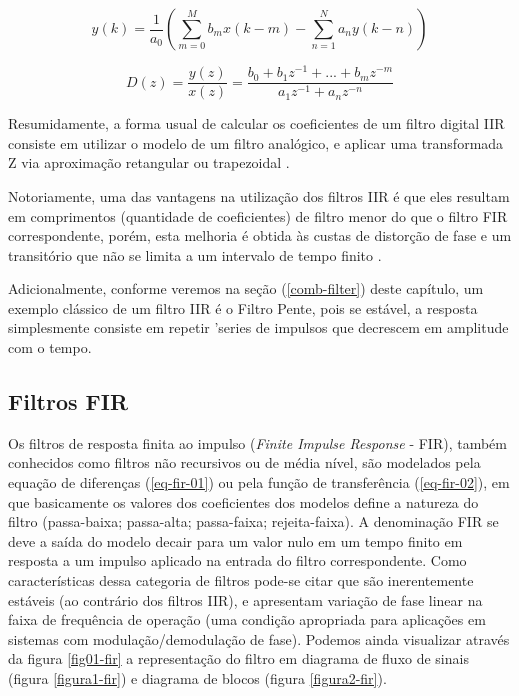 		\begin{equation}
			y(k) = \frac{1}{a_0}\left(\sum_{m=0}^{M}b_mx(k-m)-\sum_{n=1}^{N} a_ny(k-n)\right)
			\label{eq1-iir}
		\end{equation}
		
		\begin{equation}
			D(z) = \frac{y(z)}{x(z)} = \frac{b_0 + b_1z^{-1}+...+ b_mz^{-m}}{a_1z^{-1}+ a_nz^{-n}}
			\label{eq2-iir-tf}
		\end{equation}
		
		Resumidamente, a forma usual de calcular os coeficientes de um filtro digital IIR consiste em utilizar o modelo de um filtro analógico, e aplicar uma transformada Z via aproximação retangular ou trapezoidal \cite{Oppenhein1998}.
		
		Notoriamente, uma das vantagens na utilização dos filtros IIR é que eles resultam em comprimentos (quantidade de coeficientes) de filtro menor do que o filtro FIR correspondente, porém, esta melhoria é obtida às custas de distorção de fase e um transitório que não se limita a um intervalo de tempo finito \cite{Roberts1987}.
		
		Adicionalmente, conforme veremos na seção (\ref{comb-filter}) deste capítulo, um exemplo clássico de um filtro IIR é o Filtro Pente, pois se estável, a resposta simplesmente consiste em repetir 'series de impulsos que decrescem em amplitude com o tempo.
		
		
	\subsection{Filtros FIR}
	
		Os filtros de resposta finita ao impulso (\textit{Finite Impulse Response} - FIR), também conhecidos como filtros não recursivos ou de média nível, são modelados pela equação de diferenças (\ref{eq-fir-01}) ou pela função de transferência (\ref{eq-fir-02}), em que basicamente os valores dos coeficientes dos modelos define a natureza do filtro (passa-baixa; passa-alta; passa-faixa; rejeita-faixa). A denominação FIR se deve a saída do modelo decair para um valor nulo em um tempo finito em resposta a um impulso aplicado na entrada do filtro correspondente. Como características dessa categoria de filtros pode-se citar que são inerentemente estáveis (ao contrário dos filtros IIR), e apresentam variação de fase linear na faixa de frequência de operação (uma condição apropriada para aplicações em sistemas com modulação/demodulação de fase). Podemos ainda visualizar através da figura \ref{fig01-fir} a representação do filtro em diagrama de fluxo de sinais (figura \ref{figura1-fir}) e diagrama de blocos (figura \ref{figura2-fir}).
		
